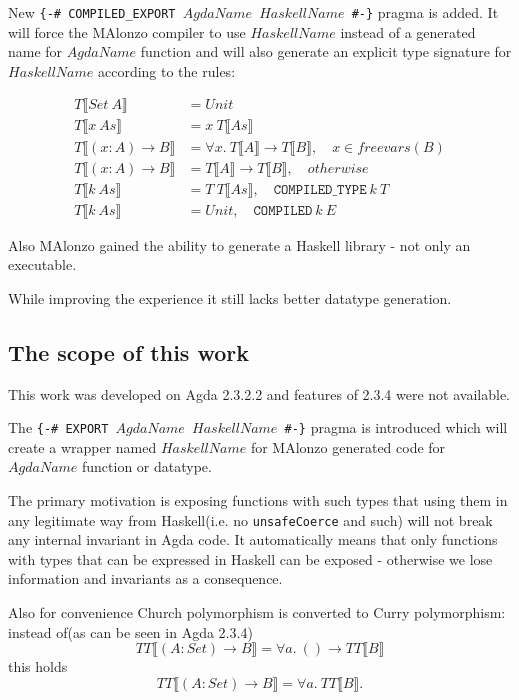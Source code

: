 New \texttt{\{-\# COMPILED\_EXPORT \(AgdaName\) \(HaskellName\) \#-\}} pragma is added.
It will force the MAlonzo compiler to use \(HaskellName\) instead of a generated name for \(AgdaName\) function and will
also generate an explicit type signature for \(HaskellName\) according to the rules:

\begin{align*}
   T\llbracket Set\ A \rrbracket &= Unit\\
   T\llbracket x\ As \rrbracket &= x\ T\llbracket As \rrbracket\\
   T\llbracket (x : A) \rightarrow B \rrbracket &= \forall x.  \ T\llbracket A \rrbracket
      \rightarrow T\llbracket B \rrbracket,\quad x \in freevars(B)\\
   T\llbracket (x : A) \rightarrow B \rrbracket &= T\llbracket A \rrbracket
      \rightarrow T\llbracket B \rrbracket,\quad otherwise\\
   T\llbracket k\ As \rrbracket &= T\ T\llbracket As \rrbracket,\quad \texttt{COMPILED\_TYPE}\ k\ T\\
   T\llbracket k\ As \rrbracket &= Unit,\quad \texttt{COMPILED}\ k\ E
\end{align*}

Also MAlonzo gained the ability to generate a Haskell library - not only an executable.

While improving the experience it still lacks better datatype generation.

\subsection{The scope of this work}

This work was developed on Agda 2.3.2.2 and features of 2.3.4 were not available.

The \texttt{\{-\# EXPORT \(AgdaName\) \(HaskellName\) \#-\}} pragma is introduced which
will create a wrapper named \(HaskellName\) for MAlonzo generated code for \(AgdaName\) function or datatype.

The primary motivation is exposing functions with such types that using them in any legitimate way
from Haskell(i.e. no \texttt{unsafeCoerce} and such) will not break any internal invariant in Agda
code. It automatically means that only functions with types that can be expressed in Haskell can be
exposed - otherwise we lose information and invariants as a consequence.

Also for convenience Church polymorphism is converted to Curry polymorphism:
instead of(as can be seen in Agda 2.3.4)
\[
   TT\llbracket (A : Set) \rightarrow B \rrbracket = \forall a.\ () \rightarrow TT\llbracket B \rrbracket
\]
this holds
\[
   TT\llbracket (A : Set) \rightarrow B \rrbracket = \forall a.\ TT\llbracket B \rrbracket.
\]

